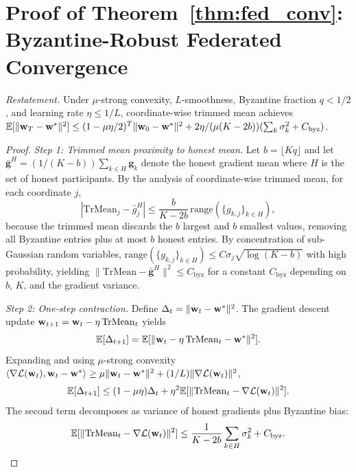 \section{Proof of Theorem~\ref{thm:fed_conv}: Byzantine-Robust Federated Convergence}
\label{app:proof_fed}

\noindent\textit{Restatement.} Under $\mu$-strong convexity, $L$-smoothness, Byzantine fraction $q<1/2$, and learning rate $\eta\le 1/L$, coordinate-wise trimmed mean achieves $\mathbb{E}[\|\mathbf{w}_T-\mathbf{w}^*\|^2]\le(1-\mu\eta/2)^T\|\mathbf{w}_0-\mathbf{w}^*\|^2 + 2\eta/(\mu(K-2b))(\sum_k\sigma_k^2 + C_{\mathrm{byz}})$.

\begin{proof}
\textit{Step 1: Trimmed mean proximity to honest mean.} Let $b=\lfloor Kq\rfloor$ and let $\bar{\mathbf{g}}^H = (1/(K-b))\sum_{k\in H}\mathbf{g}_k$ denote the honest gradient mean where $H$ is the set of honest participants. By the analysis of coordinate-wise trimmed mean, for each coordinate $j$,
\begin{equation}
|\mathrm{TrMean}_j - \bar{g}_j^H|
\le \frac{b}{K-2b}\,\mathrm{range}(\{g_{k,j}\}_{k\in H}),
\end{equation}
because the trimmed mean discards the $b$ largest and $b$ smallest values, removing all Byzantine entries plus at most $b$ honest entries. By concentration of sub-Gaussian random variables, $\mathrm{range}(\{g_{k,j}\}_{k\in H})\le C\sigma_j\sqrt{\log(K-b)}$ with high probability, yielding $\|\mathrm{TrMean}-\bar{\mathbf{g}}^H\|^2\le C_{\mathrm{byz}}$ for a constant $C_{\mathrm{byz}}$ depending on $b$, $K$, and the gradient variance.

\textit{Step 2: One-step contraction.} Define $\Delta_t = \|\mathbf{w}_t-\mathbf{w}^*\|^2$. The gradient descent update $\mathbf{w}_{t+1}=\mathbf{w}_t-\eta\,\mathrm{TrMean}_t$ yields
\begin{equation}
\mathbb{E}[\Delta_{t+1}]
= \mathbb{E}[\|\mathbf{w}_t - \eta\,\mathrm{TrMean}_t - \mathbf{w}^*\|^2].
\end{equation}
Expanding and using $\mu$-strong convexity $\langle\nabla\mathcal{L}(\mathbf{w}_t),\mathbf{w}_t-\mathbf{w}^*\rangle\ge\mu\|\mathbf{w}_t-\mathbf{w}^*\|^2 + (1/L)\|\nabla\mathcal{L}(\mathbf{w}_t)\|^2$,
\begin{equation}
\mathbb{E}[\Delta_{t+1}]
\le (1-\mu\eta)\Delta_t + \eta^2\mathbb{E}[\|\mathrm{TrMean}_t - \nabla\mathcal{L}(\mathbf{w}_t)\|^2].
\end{equation}
The second term decomposes as variance of honest gradients plus Byzantine bias:
\begin{equation}
\mathbb{E}[\|\mathrm{TrMean}_t - \nabla\mathcal{L}(\mathbf{w}_t)\|^2]
\le \frac{1}{K-2b}\sum_{k\in H}\sigma_k^2 + C_{\mathrm{byz}}.
\end{equation}


\end{proof}
